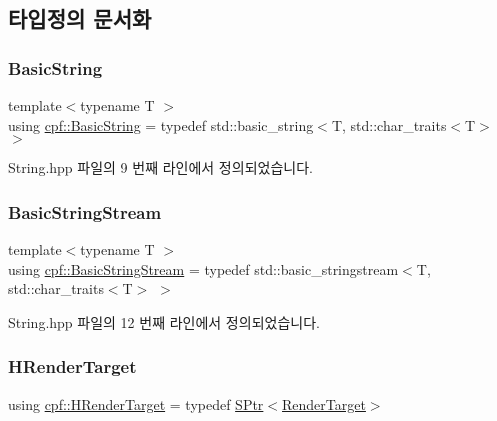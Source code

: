 \subsection{타입정의 문서화}
\mbox{\label{namespacecpf_ac91c8c57a370a5bef21ac23f876ad536}} 
\subsubsection{\texorpdfstring{Basic\+String}{BasicString}}
{\footnotesize\ttfamily template$<$typename T $>$ \\
using \hyperlink{namespacecpf_ac91c8c57a370a5bef21ac23f876ad536}{cpf\+::\+Basic\+String} = typedef std\+::basic\+\_\+string$<$T, std\+::char\+\_\+traits$<$T$>$ $>$}



String.\+hpp 파일의 9 번째 라인에서 정의되었습니다.

\mbox{\label{namespacecpf_a1fe334b3d2422535a1cfe51785d98cb8}} 
\subsubsection{\texorpdfstring{Basic\+String\+Stream}{BasicStringStream}}
{\footnotesize\ttfamily template$<$typename T $>$ \\
using \hyperlink{namespacecpf_a1fe334b3d2422535a1cfe51785d98cb8}{cpf\+::\+Basic\+String\+Stream} = typedef std\+::basic\+\_\+stringstream$<$T, std\+::char\+\_\+traits$<$T$>$ $>$}



String.\+hpp 파일의 12 번째 라인에서 정의되었습니다.

\mbox{\label{namespacecpf_a3f0ea2ea743b0adb7c12e52131d485b5}} 
\subsubsection{\texorpdfstring{H\+Render\+Target}{HRenderTarget}}
{\footnotesize\ttfamily using \hyperlink{namespacecpf_a3f0ea2ea743b0adb7c12e52131d485b5}{cpf\+::\+H\+Render\+Target} = typedef \hyperlink{namespacecpf_a91e72db639307e12a24546a0eebb1a42}{S\+Ptr}$<$\hyperlink{classcpf_1_1_render_target}{Render\+Target}$>$}



